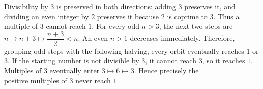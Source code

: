 Divisibility by $3$ is preserved in both directions: adding $3$ preserves it, and dividing an even integer by $2$ preserves it because $2$ is coprime to $3$. Thus a multiple of $3$ cannot reach $1$.
For every odd $n>3$, the next two steps are $n\mapsto n+3\mapsto\dfrac{n+3}{2}<n$. An even $n>1$ decreases immediately. Therefore, grouping odd steps with the following halving, every orbit eventually reaches $1$ or $3$. If the starting number is not divisible by $3$, it cannot reach $3$, so it reaches $1$. Multiples of $3$ eventually enter $3\mapsto6\mapsto3$. Hence precisely the $\boxed{\text{positive multiples of }3}$ never reach $1$.
